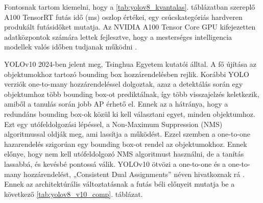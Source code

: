Fontosnak tartom kiemelni, hogy a \ref{tab:yolov8_kvantalas}. 
táblázatban szereplő A100 TensorRT futás idő (ms) oszlop értékei, egy
csúcskategóriás hardveren produkált futásidőket mutatja. Az NVIDIA A100
Tensor Core GPU kifejezetten adatközpontok számára lettek fejlesztve,
hogy a mesterséges intelligencia modellek valós időben tudjanak
működni \cite{nvidiaNVIDIAA100Tensor}.

YOLOv10 2024-ben jelent meg, Tsinghua Egyetem kutatói álltal. A fő
újítása az objektumokhoz tartozó bounding box hozzárendelésben rejlik.
Korábbi YOLO verziók one-to-many hozzárendeléssel dolgoztak, azaz a
detektálás során egy objektumhoz több bounding box-ot prediktálnak, így
több visszajelzés keletkezik, amiből a tanulás során jobb AP érhető el.
Ennek az a hátránya, hogy a redundáns bounding box-ok közül ki kell
választani egyet, minden objektumhoz. Ezt egy utófeldolgozási lépéssel,
a Non-Maximum Suppression (NMS) algoritmussal oldják meg, ami lassítja a
működést. Ezzel szemben a one-to-one hazarendelés szigorúan egy bounding
box-ot rendel az objektumokhoz. Ennek előnye, hogy nem kell
utófeldolgozó NMS algoritmust használni, de a tanítás lassabbá, és
kevésbé pontossá válik. YOLOv10 ötvözi a one-to-one és a one-to-many
hozzárendelést, „Consistent Dual Assignments''\cite{wangYOLOv10RealTimeEndtoEnd2024} néven hivatkoznak
rá \cite{hussainYOLOv5YOLOv8YOLOv102024}. Ennek az architektúrális változtatásnak a futás béli
előnyeit mutatja be a következő \ref{tab:yolov8_v10_comp}. táblázat.

 \begin{table}[htbp]
	     \centering
	     \caption{YOLOv8 és v10 összehasonlítása \cite{hussainYOLOv5YOLOv8YOLOv102024}}
	     \label{tab:yolov8_v10_comp}
	     \vspace{0.2cm}
	 \end{table}


